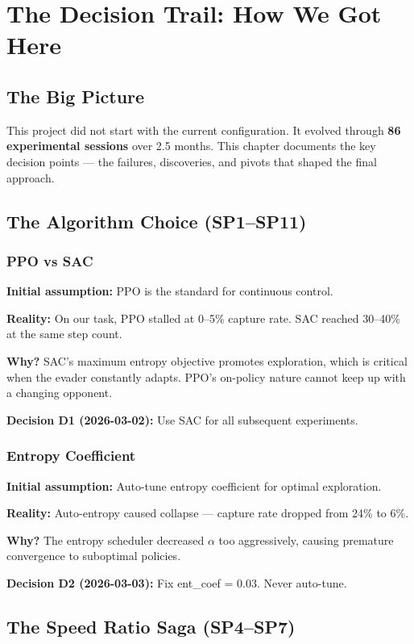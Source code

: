 \documentclass[11pt,a4paper]{report}
\begin{document}
\chapter{The Decision Trail: How We Got Here}
\label{chap:decisions}

\section{The Big Picture}

This project did not start with the current configuration. It evolved through \textbf{86 experimental sessions} over 2.5 months. This chapter documents the key decision points --- the failures, discoveries, and pivots that shaped the final approach.

\section{The Algorithm Choice (SP1--SP11)}

\subsection{PPO vs SAC}
\textbf{Initial assumption:} PPO is the standard for continuous control.

\textbf{Reality:} On our task, PPO stalled at 0--5\% capture rate. SAC reached 30--40\% at the same step count.

\textbf{Why?} SAC's maximum entropy objective promotes exploration, which is critical when the evader constantly adapts. PPO's on-policy nature cannot keep up with a changing opponent.

\textbf{Decision D1 (2026-03-02):} Use SAC for all subsequent experiments.

\subsection{Entropy Coefficient}
\textbf{Initial assumption:} Auto-tune entropy coefficient for optimal exploration.

\textbf{Reality:} Auto-entropy caused collapse --- capture rate dropped from 24\% to 6\%.

\textbf{Why?} The entropy scheduler decreased $\alpha$ too aggressively, causing premature convergence to suboptimal policies.

\textbf{Decision D2 (2026-03-03):} Fix ent\_coef = 0.03. Never auto-tune.

\section{The Speed Ratio Saga (SP4--SP7)}
\end{document}
